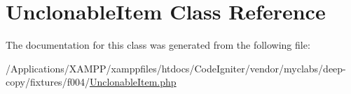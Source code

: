 \hypertarget{class_deep_copy_1_1f004_1_1_unclonable_item}{}\section{Unclonable\+Item Class Reference}
\label{class_deep_copy_1_1f004_1_1_unclonable_item}


The documentation for this class was generated from the following file\+:\begin{DoxyCompactItemize}
\item 
/\+Applications/\+X\+A\+M\+P\+P/xamppfiles/htdocs/\+Code\+Igniter/vendor/myclabs/deep-\/copy/fixtures/f004/\mbox{\hyperlink{_unclonable_item_8php}{Unclonable\+Item.\+php}}\end{DoxyCompactItemize}
